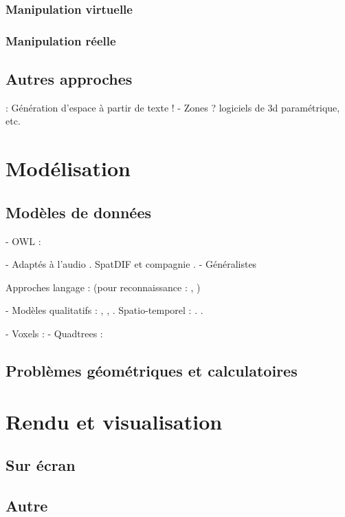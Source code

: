 \documentclass[french,12pt]{article}
\begin{document}
\subsubsection{Manipulation virtuelle}
\cite{jacob_design_2014} %
\cite{cohen_interface_1999}
\subsubsection{Manipulation réelle}
\cite{grossman_interface_2003}


\subsection{Autres approches}
\cite{andriamarozakaniaina_du_2012} : Génération d'espace à partir de texte !
\cite{van_nort_lom_2006}
 - Zones ? logiciels de 3d paramétrique, etc.

\section{Modélisation}
\cite{porter_handbook_2008}
\cite{grenon_formal_2003}
\cite{zhang_timed_2014}
\cite{benford_spatial_1993}

\cite{matlage_every_2011}
\subsection{Modèles de données}
- OWL : \cite{mefteh_approche_2013}

- Adaptés à l'audio
. SpatDIF et compagnie \cite{peters_spatial_2013}\cite{kendall_towards_2008}
. \cite{kondoz_object-based_2014}
- Généralistes
\cite{hudak_arrows_2003}

Approches langage : (pour reconnaissance : \cite{spranger_recruitment_2011}\cite{spranger_emergent_2012}, )

- Modèles qualitatifs : \cite{chen_survey_2015}, \cite{bhatt_geospatial_2014}, \cite{schlieder_qualitative_1996,dorr_qualitative_2014}. Spatio-temporel : \cite{hazarika_qualitative_2012}. \cite{clementini_global_1997}.

- Voxels : \cite{kaufman_volume_1993}
- Quadtrees : \cite{eppstein_skip_2008}
\subsection{Problèmes géométriques et calculatoires}

\section{Rendu et visualisation}
\cite{hortner_spaxels_2012}
\subsection{Sur écran}
\subsection{Autre}
\printbibliography
\end{document}
